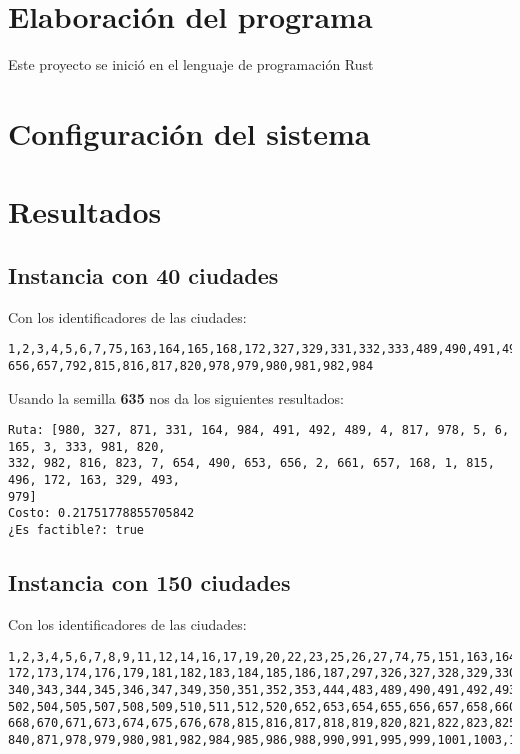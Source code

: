 \documentclass{article}
\begin{document}
\section{Elaboración del programa}

Este proyecto se inició en el lenguaje de programación Rust

\section{Configuración del sistema}



\section{Resultados}

\subsection{Instancia con 40 ciudades}
Con los identificadores de las ciudades:
\begin{verbatim}
1,2,3,4,5,6,7,75,163,164,165,168,172,327,329,331,332,333,489,490,491,492,493,496,652,653,654,
656,657,792,815,816,817,820,978,979,980,981,982,984  
\end{verbatim}

Usando la semilla \textbf{635} nos da los siguientes resultados:
\begin{verbatim}
Ruta: [980, 327, 871, 331, 164, 984, 491, 492, 489, 4, 817, 978, 5, 6, 165, 3, 333, 981, 820,
332, 982, 816, 823, 7, 654, 490, 653, 656, 2, 661, 657, 168, 1, 815, 496, 172, 163, 329, 493, 
979]
Costo: 0.21751778855705842
¿Es factible?: true
\end{verbatim}

\subsection{Instancia con 150 ciudades}
Con los identificadores de las ciudades:
\begin{verbatim}
1,2,3,4,5,6,7,8,9,11,12,14,16,17,19,20,22,23,25,26,27,74,75,151,163,164,165,166,167,168,169,171,
172,173,174,176,179,181,182,183,184,185,186,187,297,326,327,328,329,330,331,332,333,334,336,339,
340,343,344,345,346,347,349,350,351,352,353,444,483,489,490,491,492,493,494,495,496,499,500,501,
502,504,505,507,508,509,510,511,512,520,652,653,654,655,656,657,658,660,661,662,663,665,666,667,
668,670,671,673,674,675,676,678,815,816,817,818,819,820,821,822,823,825,826,828,829,832,837,839,
840,871,978,979,980,981,982,984,985,986,988,990,991,995,999,1001,1003,1004,1037,1038,1073,1075
\end{verbatim}
\end{document}
